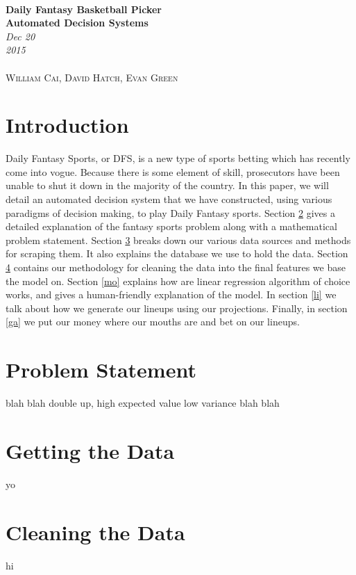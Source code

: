 \documentclass[12pt]{article}
\renewcommand{\=}[1]{\stackrel{#1}{=}} %
\theoremstyle{definition}
\begin{document}
{\noindent\Huge\bf  \\[0.5\baselineskip] {\selectfont Daily Fantasy Basketball Picker}         }\\[2\baselineskip] %
{ {\bf {}\selectfont Automated Decision Systems}\\ {\textit{\selectfont     Dec 20 2015}}}~~~~~~~~~~~~~~~~~~~~~~~~~~~~~~~~~~~~~~~~~~~~~~~~~~~~~~~~~~~~~~~~~~~~~~~~~~~~~\
{\large \textsc{ \\William Cai, David Hatch, Evan Green}} %
\\[1.4\baselineskip] 
\section{Introduction} 
\label{in}
 
Daily Fantasy Sports, or DFS, is a new type of sports betting which has recently come into vogue.  Because there is some element of skill, prosecutors have been unable to shut it down in the majority of the country.  In this paper, we will detail an automated decision system that we have constructed, using various paradigms of decision making, to play Daily Fantasy sports.  Section \ref{ps} gives a detailed explanation of the fantasy sports problem along with a mathematical problem statement.  Section \ref{da} breaks down our various data sources and methods for scraping them.  It also explains the database we use to hold the data.  Section \ref{cl} contains our methodology for cleaning the data into the final features we base the model on.  Section \ref{mo} explains how are linear regression algorithm of choice works, and gives a human-friendly explanation of the model. In section \ref{li} we talk about how we generate our lineups using our projections.  Finally, in section \ref{ga} we put our money where our mouths are and bet on our lineups.  

\section{Problem Statement} 
\label{ps}
blah blah double up, high expected value low variance blah blah

\section{Getting the Data} 
\label{da}
yo

\section{Cleaning the Data} 
\label{cl}
hi
\end{document}
